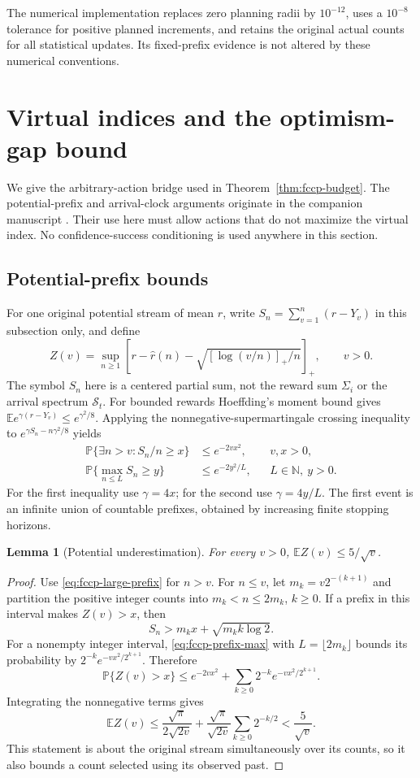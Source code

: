 \documentclass[11pt]{article}
\newtheorem{lemma}[theorem]{Lemma}
\theoremstyle{remark}
\newcommand{\E}{\mathbb E}
\newcommand{\Prob}{\mathbb P}
\begin{document}
The numerical implementation replaces zero planning radii by
$10^{-12}$, uses a $10^{-8}$ tolerance for positive planned increments,
and retains the original actual counts for all statistical updates.
Its fixed-prefix evidence is not altered by these numerical conventions.
\section{Virtual indices and the optimism-gap bound}\label{app:optimism-gap}
We give the arbitrary-action bridge used in
Theorem~\ref{thm:fccp-budget}. The potential-prefix and arrival-clock
arguments originate in the companion manuscript
\citet{temporalgeometry2026}. Their use here must allow actions that do
not maximize the virtual index. No confidence-success conditioning is
used anywhere in this section.

\subsection{Potential-prefix bounds}
For one original potential stream of mean $r$, write
$S_n=\sum_{v=1}^n(r-Y_v)$ in this subsection only, and define
\[
 Z(v)=\sup_{n\ge1}\left[r-\hat r(n)-
                \sqrt{[\log(v/n)]_+/n}\right]_+,
 \qquad v>0.
\]
The symbol $S_n$ here is a centered partial sum, not the reward sum
$\Sigma_i$ or the arrival spectrum $\mathcal S_t$.
For bounded rewards Hoeffding's moment bound gives
$\E e^{\gamma(r-Y_v)}\le e^{\gamma^2/8}$.
Applying the nonnegative-supermartingale crossing inequality to
$e^{\gamma S_n-n\gamma^2/8}$ yields
\begin{align}
 \Prob\{\exists n>v:S_n/n\ge x\}&\le e^{-2vx^2},
       &&v,x>0,\label{eq:fccp-large-prefix}\\
 \Prob\{\max_{n\le L}S_n\ge y\}&\le e^{-2y^2/L},
       &&L\in\mathbb N,\ y>0.\label{eq:fccp-prefix-max}
\end{align}
For the first inequality use $\gamma=4x$; for the second use
$\gamma=4y/L$. The first event is an infinite union of countable
prefixes, obtained by increasing finite stopping horizons.

\begin{lemma}[Potential underestimation]\label{lem:fccp-Z}
For every $v>0$, $\E Z(v)\le5/\sqrt v$.
\end{lemma}
\begin{proof}
Use \eqref{eq:fccp-large-prefix} for $n>v$. For $n\le v$, let
$m_k=v2^{-(k+1)}$ and partition the positive integer counts into
$m_k<n\le2m_k$, $k\ge0$. If a prefix in this interval makes
$Z(v)>x$, then
\[
 S_n>m_kx+\sqrt{m_kk\log2}.
\]
For a nonempty integer interval,
\eqref{eq:fccp-prefix-max} with $L=\lfloor2m_k\rfloor$ bounds its
probability by $2^{-k}e^{-vx^2/2^{k+1}}$. Therefore
\[
 \Prob\{Z(v)>x\}\le e^{-2vx^2}
             +\sum_{k\ge0}2^{-k}e^{-vx^2/2^{k+1}}.
\]
Integrating the nonnegative terms gives
\[
 \E Z(v)\le\frac{\sqrt\pi}{2\sqrt{2v}}+
     \frac{\sqrt\pi}{\sqrt{2v}}\sum_{k\ge0}2^{-k/2}
       <\frac5{\sqrt v}.
\]
This statement is about the original stream simultaneously over its
counts, so it also bounds a count selected using its observed past.
\end{proof}
\end{document}
